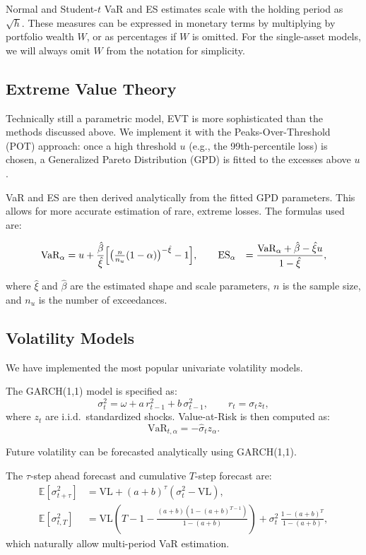 \documentclass{article}
\begin{document}
Normal and Student-$t$ VaR and ES estimates scale with the holding period as $\sqrt{h}$. These measures can be expressed in monetary terms by multiplying by portfolio wealth $W$, or as percentages if $W$ is omitted. For the single-asset models, we will always omit $W$ from the notation for simplicity.



\subsection{Extreme Value Theory}


Technically still a parametric model, EVT is more sophisticated than the methods discussed above. We implement it with the Peaks-Over-Threshold (POT) approach: once a high threshold $u$ (e.g., the 99th-percentile loss) is chosen, a Generalized Pareto Distribution (GPD) is fitted to the excesses above $u$. 

VaR and ES are then derived analytically from the fitted GPD parameters. This allows for more accurate estimation of rare, extreme losses. The formulas used are:

\[
\begin{aligned}
{\text{VaR}}_\alpha &= u + \frac{\hat{\beta}}{\hat{\xi}}
\Bigl[\bigl(\tfrac{n}{n_u}(1-\alpha)\bigr)^{-\hat{\xi}} - 1\Bigr],\qquad
{\text{ES}}_\alpha &= \frac{{\text{VaR}}_\alpha + \hat{\beta} - \hat{\xi} u}{1 - \hat{\xi}},
\end{aligned}
\]

where $\hat{\xi}$ and $\hat{\beta}$ are the estimated shape and scale parameters, $n$ is the sample size, and $n_u$ is the number of exceedances.


\subsection{Volatility Models}

We have implemented the most popular univariate volatility models.

The GARCH(1,1) model is specified as:
\[
  \sigma_t^2 = \omega + a\, r_{t-1}^2 + b\, \sigma_{t-1}^2, \qquad r_t = \sigma_t z_t,
\]
where \( z_t \) are i.i.d.\ standardized shocks. Value-at-Risk is then computed as:
\[
  \text{VaR}_{t,\alpha} = -\hat{\sigma}_t z_\alpha.
\]

Future volatility can be forecasted analytically using GARCH(1,1).

The \( \tau \)-step ahead forecast and cumulative \( T \)-step forecast are:
\begin{align*}
  \mathbb{E}[\sigma_{t+\tau}^2] &= \mathrm{VL} + (a + b)^\tau(\sigma_t^2 - \mathrm{VL}),  \\  
  \mathbb{E}[\sigma_{t,T}^2] &= \mathrm{VL}\left(T - 1 - \frac{(a + b)(1 - (a + b)^{T - 1})}{1 - (a + b)}\right)
    + \sigma_t^2\, \frac{1 - (a + b)^T}{1 - (a + b)},
\end{align*}
which naturally allow multi-period VaR estimation.
\end{document}
